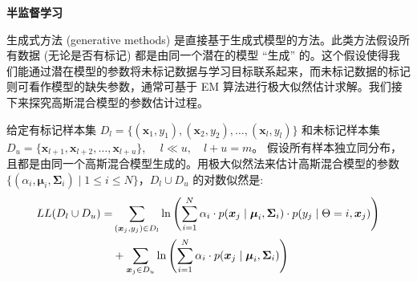 \documentclass[answers]{exam}  %
\begin{document}
\begin{questions}
\begin{solution}
\end{solution}



\question [40] \textbf{半监督学习}

生成式方法 (generative methods) 是直接基于生成式模型的方法。此类方法假设所有数据 (无论是否有标记) 都是由同一个潜在的模型 “生成” 的。这个假设使得我们能通过潜在模型的参数将未标记数据与学习目标联系起来，而未标记数据的标记则可看作模型的缺失参数，通常可基于 EM 算法进行极大似然估计求解。我们接下来探究高斯混合模型的参数估计过程。

给定有标记样本集 $D_l = \{(\boldsymbol{x}_1, y_1), (\boldsymbol{x}_2, y_2), \dots, (\boldsymbol{x}_l, y_l)\}$ 和未标记样本集
$D_u = \{\boldsymbol{x}_{l+1}, \boldsymbol{x}_{l+2}, \dots, \boldsymbol{x}_{l+u}\}$, $\quad l \ll u, \quad l + u = m$。
假设所有样本独立同分布，且都是由同一个高斯混合模型生成的。用极大似然法来估计高斯混合模型的参数 $\{(\alpha_i, \boldsymbol{\mu}_i, \boldsymbol{\Sigma}_i) \mid 1 \leq i \leq N\}$，$D_l \cup D_u$ 的对数似然是:
\begin{align}
    LL(D_l \cup D_u) = & \sum_{(\boldsymbol{x}_j, y_j) \in D_l} \ln \left( \sum_{i=1}^N \alpha_i \cdot p(\boldsymbol{x}_j \mid \boldsymbol{\mu}_i, \boldsymbol{\Sigma}_i) \cdot p(y_j \mid \Theta = i, \boldsymbol{x}_j) \right) \notag \\
    & + \sum_{\boldsymbol{x}_j \in D_u} \ln \left( \sum_{i=1}^N \alpha_i \cdot p(\boldsymbol{x}_j \mid \boldsymbol{\mu}_i, \boldsymbol{\Sigma}_i) \right)
\end{align}


\end{questions}
\end{document}

